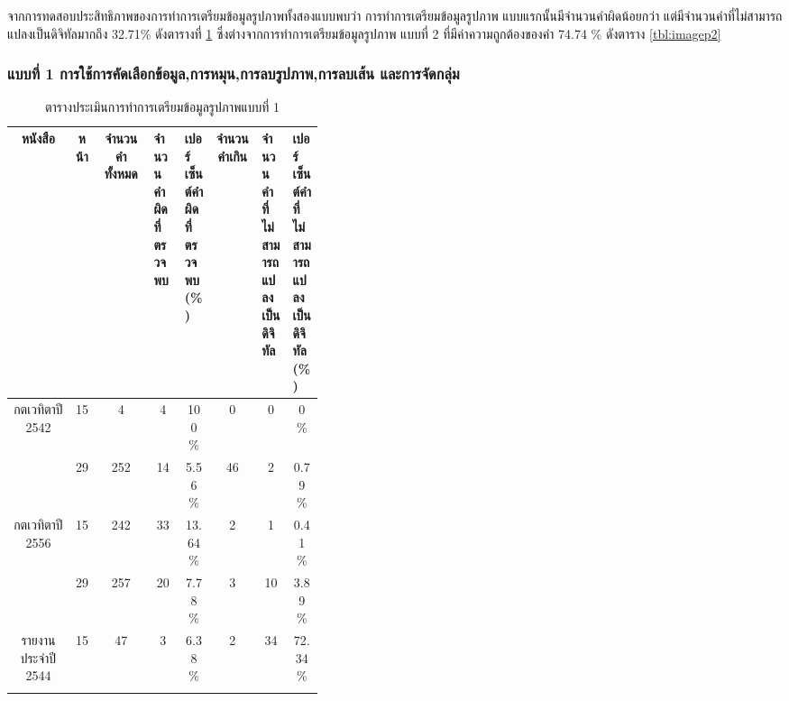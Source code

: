 จากการทดสอบประสิทธิภาพของการทำการเตรียมข้อมูลรูปภาพทั้งสองแบบพบว่า การทำการเตรียมข้อมูลรูปภาพ แบบแรกนั้นมีจำนวนคำผิดน้อยกว่า แต่มีจำนวนคำที่ไม่สามารถแปลงเป็นดิจิทัลมากถึง 32.71\% ดังตารางที่ \ref{tbl:imagep1} ซึ่งต่างจากการทำการเตรียมข้อมูลรูปภาพ แบบที่ 2 ที่มีค่าความถูกต้องของคำ 74.74 \% ดังตาราง \ref{tbl:imagep2}

\subsubsection{แบบที่ 1 การใช้การคัดเลือกข้อมูล,การหมุน,การลบรูปภาพ,การลบเส้น และการจัดกลุ่ม}
\begin{table}[H]
    \caption{ตารางประเมินการทำการเตรียมข้อมูลรูปภาพแบบที่ 1 }\label{tbl:imagep1}
    \begin{tabular}{|c|c|c|p{0.1\linewidth}|p{0.1\linewidth}|c|p{0.1\linewidth}|p{0.1\linewidth}|}
        \hline
        หนังสือ                             & หน้า  & จำนวนคำทั้งหมด & จำนวนคำผิดที่ตรวจพบ & เปอร์เซ็นต์คำผิดที่ตรวจพบ(\%)    & จำนวนคำเกิน & จำนวนคำที่ไม่สามารถแปลงเป็นดิจิทัล & เปอร์เซ็นต์คำที่ไม่สามารถแปลงเป็นดิจิทัล(\%)    \\ \hline
        \multirow{2}{*}{กตเวทิตาปี 2542}      & 15    & 4         & \multicolumn{1}{c|}{4  }         & \multicolumn{1}{c|}{100 \%  } & \multicolumn{1}{c|}{0  }    & \multicolumn{1}{c|}{0  }             & \multicolumn{1}{c|}{0 \%    }\\ \cline{2-8} 
                                            & 29    & 252       & \multicolumn{1}{c|}{14 }         & \multicolumn{1}{c|}{5.56 \% }  &\multicolumn{1}{c|}{46}     &\multicolumn{1}{c|}{2 }              &\multicolumn{1}{c|}{0.79 \%} \\ \hline
        \multirow{2}{*}{กตเวทิตาปี 2556}      & 15    & 242       & \multicolumn{1}{c|}{33 }         & \multicolumn{1}{c|}{13.64 \%}  &\multicolumn{1}{c|}{2 }     &\multicolumn{1}{c|}{1 }              &\multicolumn{1}{c|}{0.41 \%} \\ \cline{2-8} 
                                            & 29    & 257       & \multicolumn{1}{c|}{20 }         & \multicolumn{1}{c|}{7.78 \% } & \multicolumn{1}{c|}{3  }    & \multicolumn{1}{c|}{10 }             & \multicolumn{1}{c|}{3.89 \% }\\ \hline
        \multirow{2}{*}{รายงานประจำปี 2544}   & 15    & 47        & \multicolumn{1}{c|}{3  }         & \multicolumn{1}{c|}{6.38 \% } & \multicolumn{1}{c|}{2  }    & \multicolumn{1}{c|}{34 }             & \multicolumn{1}{c|}{72.34 \%} \\ \cline{2-8} 

\end{tabular}
\end{table}
